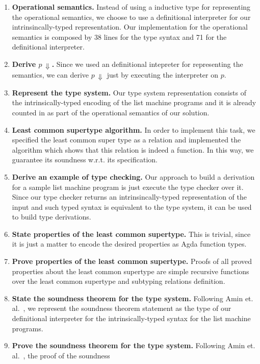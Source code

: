 \documentclass[sigconf]{acmart}
\theoremstyle{definition}
\begin{document}
\begin{enumerate}
  \item \textbf{Operational semantics.} Instead of using a inductive type for representing the operational semantics, we choose to
        use a definitional interpreter for our intrinsincally-typed representation. Our implementation for the operational
        semantics is composed by 38 lines for the type syntax and 71 for the definitional interpreter.
  \item \textbf{Derive $p\,\Downarrow$.} Since we used an definitional intepreter for representing the semantics, we can derive
        $p\,\Downarrow$ just by executing the interpreter on $p$.
  \item \textbf{Represent the type system.} Our type system representation consists of the intrinsically-typed encoding of
        the list machine programs and it is already counted in as part of the operational semantics of our solution.
  \item \textbf{Least common supertype algorithm.} In order to implement this task, we specified the least common super type
        as a relation and implemented the algorithm which shows that this relation is indeed a function. In this way, we
        guarantee its soundness w.r.t. its specification.
  \item \textbf{Derive an example of type checking.} Our approach to build a derivation for a sample list machine program
        is just execute the type checker over it. Since our type checker returns an intrinsincally-typed representation of
        the input and such typed syntax is equivalent to the type system, it can be used to build type derivations.
  \item \textbf{State properties of the least common supertype.} This is trivial, since it is just a matter to encode the
        desired properties as Agda function types.
  \item \textbf{Prove properties of the least common supertype.} Proofs of all proved properties about the least common supertype
        are simple recursive functions over the least common supertype and subtyping relations definition.
  \item \textbf{State the soundness theorem for the type system.} Following Amin et. al.~\cite{Amin17}, we represent the soundness
        theorem statement as the type of our definitional interpreter for the intrinsically-typed syntax for the list machine
        programs.
  \item \textbf{Prove the soundness theorem for the type system.} Following Amin et. al.~\cite{Amin17}, the proof of the soundness

\end{enumerate}
\end{document}

